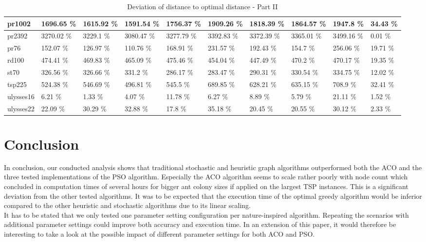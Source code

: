 \documentclass[conference]{IEEEtran}
\begin{document}
\begin{table}[h]
\begin{adjustbox}{width=\columnwidth}
\begin{tabular}{ | l | l | l | l | l | l | l | l | l | l | }
pr1002 & 1696.65 \% & 1615.92 \% & 1591.54 \% & 1756.37 \% & 1909.26 \% & 1818.39 \% & 1864.57 \% & 1947.8 \% & 34.43 \% \\ \hline
pr2392 & 3270.02 \% & 3229.1 \% & 3080.47 \% & 3277.79 \% & 3392.83 \% & 3372.39 \% & 3365.01 \% & 3499.16 \% & 0.01 \% \\ \hline
pr76 & 152.07 \% & 126.97 \% & 110.76 \% & 168.91 \% & 231.57 \% & 192.43 \% & 154.7 \% & 256.06 \% & 19.71 \% \\ \hline
rd100 & 474.41 \% & 469.83 \% & 465.09 \% & 475.46 \% & 454.04 \% & 447.49 \% & 470.2 \% & 470.17 \% & 19.35 \% \\ \hline
st70 & 326.56 \% & 326.66 \% & 331.2 \% & 286.17 \% & 283.47 \% & 290.31 \% & 330.54 \% & 334.75 \% & 12.02 \% \\ \hline
tsp225 & 524.38 \% & 546.69 \% & 496.81 \% & 545.5 \% & 689.85 \% & 628.21 \% & 635.15 \% & 708.9 \% & 32.41 \% \\ \hline
ulysses16 & 6.21 \% & 1.33 \% & 4.07 \% & 11.78 \% & 6.27 \% & 8.89 \% & 5.79 \% & 21.11 \% & 1.52 \% \\ \hline
ulysses22 & 22.09 \% & 30.29 \% & 32.88 \% & 17.8 \% & 35.18 \% & 20.45 \% & 20.55 \% & 30.12 \% & 2.33 \% \\ \hline

	    \end{tabular}
	    \end{adjustbox}
	    \caption{Deviation of distance to optimal distance - Part II}
	    \label{tab:deviationp2}
	\end{table}


    \section{Conclusion}
    In conclusion, our conducted analysis shows that traditional stochastic and heuristic graph algorithms outperformed both the ACO and the three tested implementations of the PSO algorithm. Especially the ACO algorithm seems to scale rather poorly with node count which concluded in computation times of several hours for bigger ant colony sizes if applied on the largest TSP instances. This is a significant deviation from the other tested algorithms. It was to be expected that the execution time of the optimal greedy algorithm would be inferior compared to the other heuristic and stochastic algorithms due to its linear scaling.\\
    It has to be stated that we only tested one parameter setting configuration per nature-inspired algorithm. Repeating the scenarios with additional parameter settings could improve both accuracy and execution time. In an extension of this paper, it would therefore be interesting to take a look at the possible impact of different parameter settings for both ACO and PSO.
\end{document}
